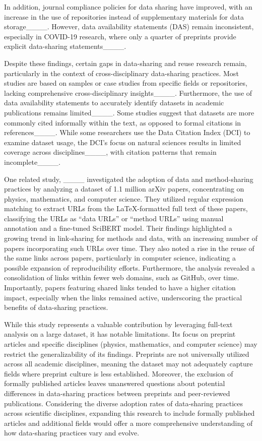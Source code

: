 In addition, journal compliance policies for data sharing have improved, with an increase in the use of repositories instead of supplementary materials for data storage____. However, data availability statements (DAS) remain inconsistent, especially in COVID-19 research, where only a quarter of preprints provide explicit data-sharing statements____.

Despite these findings, certain gaps in data-sharing and reuse research remain, particularly in the context of cross-disciplinary data-sharing practices. Most studies are based on samples or case studies from specific fields or repositories, lacking comprehensive cross-disciplinary insights____. Furthermore, the use of data availability statements to accurately identify datasets in academic publications remains limited____. Some studies suggest that datasets are more commonly cited informally within the text, as opposed to formal citations in references____. While some researchers use the Data Citation Index (DCI) to examine dataset usage, the DCI's focus on natural sciences results in limited coverage across disciplines____, with citation patterns that remain incomplete____.

One related study, ____ investigated the adoption of data and method-sharing practices by analyzing a dataset of 1.1 million arXiv papers, concentrating on physics, mathematics, and computer science. They utilized regular expression matching to extract URLs from the LaTeX-formatted full text of these papers, classifying the URLs as ``data URLs'' or ``method URLs'' using manual annotation and a fine-tuned SciBERT model. Their findings highlighted a growing trend in link-sharing for methods and data, with an increasing number of papers incorporating such URLs over time. They also noted a rise in the reuse of the same links across papers, particularly in computer science, indicating a possible expansion of reproducibility efforts. Furthermore, the analysis revealed a consolidation of links within fewer web domains, such as GitHub, over time. Importantly, papers featuring shared links tended to have a higher citation impact, especially when the links remained active, underscoring the practical benefits of data-sharing practices.

While this study represents a valuable contribution by leveraging full-text analysis on a large dataset, it has notable limitations. Its focus on preprint articles and specific disciplines (physics, mathematics, and computer science) may restrict the generalizability of its findings. Preprints are not universally utilized across all academic disciplines, meaning the dataset may not adequately capture fields where preprint culture is less established. Moreover, the exclusion of formally published articles leaves unanswered questions about potential differences in data-sharing practices between preprints and peer-reviewed publications. Considering the diverse adoption rates of data-sharing practices across scientific disciplines, expanding this research to include formally published articles and additional fields would offer a more comprehensive understanding of how data-sharing practices vary and evolve.


